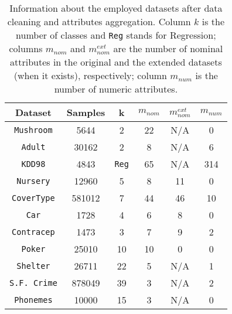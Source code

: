\begin{table}
\centering
\caption{Information about  the employed datasets after data cleaning and attributes aggregation.
Column $k$ is the number of classes and {\tt Reg} stands
for Regression; columns $m_{nom}$ and $m^{ext}_{nom}$ are the
number of  nominal attributes in the original and the
extended datasets (when it exists), respectively; column $m_{num}$ is the number of  numeric attributes.}
\label{exp:datasets}

\medskip

\begin{tabular}{c|c|c|c|c|c}
Dataset             & Samples  &  k        & $m_{nom}$ &  $m^{ext}_{nom}$ &   $m_{num}$   \\  \hline
{\tt Mushroom}      & 5644     & 2         & 22        & N/A              & 0             \\ 
{\tt Adult}         & 30162    & 2         & 8         & N/A              & 6             \\
{\tt KDD98}         & 4843     & {\tt Reg} & 65        & N/A              & 314           \\ 
{\tt Nursery}       & 12960    & 5         & 8         & 11               & 0             \\ 
{\tt CoverType}     & 581012   & 7         & 44        & 46               & 10            \\ 
{\tt Car}           & 1728     & 4         & 6         & 8                & 0             \\ 
{\tt Contracep}     & 1473     & 3         & 7         & 9                & 2             \\ 
{\tt Poker}         & 25010    & 10        & 10        & 0                & 0             \\
{\tt Shelter}       & 26711    & 22        & 5         & N/A              & 1             \\      
{\tt S.F. Crime}    & 878049   & 39        & 3         & N/A              & 2             \\  
{\tt Phonemes}      & 10000    & 15        & 3         & N/A              & 0 
\normalsize
\end{tabular}

\end{table}



